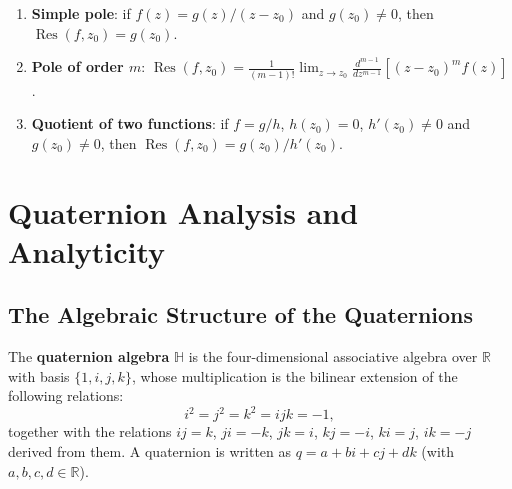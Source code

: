 \begin{example}\label{ex:residue_examples}
\begin{enumerate}[label=(\roman*)]
    \item \textbf{Simple pole}: if $f(z) = g(z)/(z-z_0)$ and $g(z_0) \ne 0$, then $\operatorname{Res}(f, z_0) = g(z_0)$.
    \item \textbf{Pole of order $m$}: $\operatorname{Res}(f, z_0) = \frac{1}{(m-1)!} \lim_{z \to z_0} \frac{d^{m-1}}{dz^{m-1}}\left[(z-z_0)^m f(z)\right]$.
    \item \textbf{Quotient of two functions}: if $f = g/h$, $h(z_0) = 0$, $h'(z_0) \ne 0$ and $g(z_0) \ne 0$, then $\operatorname{Res}(f, z_0) = g(z_0)/h'(z_0)$.
\end{enumerate}
\end{example}

\section{Quaternion Analysis and Analyticity}\label{sec:quaternion_analysis}

\subsection{The Algebraic Structure of the Quaternions}

\begin{definition}\label{def:quaternion_algebra}
The \textbf{quaternion algebra} $\mathbb{H}$ is the four-dimensional associative algebra over $\mathbb{R}$ with basis $\{1, i, j, k\}$, whose multiplication is the bilinear extension of the following relations:
\[
i^2 = j^2 = k^2 = ijk = -1,
\]
together with the relations $ij = k$, $ji = -k$, $jk = i$, $kj = -i$, $ki = j$, $ik = -j$ derived from them. A quaternion is written as $q = a + bi + cj + dk$ (with $a, b, c, d \in \mathbb{R}$).
\end{definition}

